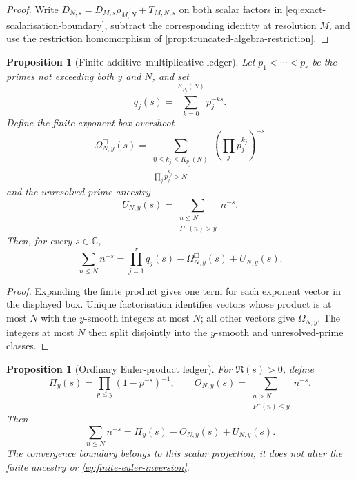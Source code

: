 \documentclass[11pt,a4paper]{article}
\newtheorem{proposition}[theorem]{Proposition}
\theoremstyle{definition}
\newcommand{\C}{\mathbb{C}}
\begin{document}
\begin{proof}
Write $D_{N,s}=D_{M,s}\rho_{M,N}+T_{M,N,s}$ on both scalar factors in
\cref{eq:exact-scalarisation-boundary}, subtract the corresponding identity at
resolution $M$, and use the restriction homomorphism of
\cref{prop:truncated-algebra-restriction}.
\end{proof}

\begin{proposition}[Finite additive--multiplicative ledger]
\label{prop:finite-additive-multiplicative-ledger}
Let $p_1<\cdots<p_r$ be the primes not exceeding both $y$ and $N$, and set
\[
  q_j(s)=\sum_{k=0}^{K_{p_j}(N)}p_j^{-ks}.
\]
Define the finite exponent-box overshoot
\[
  \Omega^\Box_{N,y}(s)
  =
  \sum_{\substack{0\leq k_j\leq K_{p_j}(N)\\
                  \prod_jp_j^{k_j}>N}}
  \left(\prod_jp_j^{k_j}\right)^{-s}
\]
and the unresolved-prime ancestry
\[
  U_{N,y}(s)
  =
  \sum_{\substack{n\leq N\\P^+(n)>y}}n^{-s}.
\]
Then, for every $s\in\C$,
\begin{equation}
\label{eq:finite-additive-multiplicative-ledger}
  \sum_{n\leq N}n^{-s}
  =
  \prod_{j=1}^{r}q_j(s)
  -\Omega^\Box_{N,y}(s)
  +U_{N,y}(s).
\end{equation}
\end{proposition}

\begin{proof}
Expanding the finite product gives one term for each exponent vector in the
displayed box. Unique factorisation identifies vectors whose product is at most
$N$ with the $y$-smooth integers at most $N$; all other vectors give
$\Omega^\Box_{N,y}$. The integers at most $N$ then split disjointly into the
$y$-smooth and unresolved-prime classes.
\end{proof}

\begin{proposition}[Ordinary Euler-product ledger]
\label{prop:ordinary-euler-product-ledger}
For $\Re(s)>0$, define
\[
  \Pi_y(s)=\prod_{p\leq y}(1-p^{-s})^{-1},
  \qquad
  O_{N,y}(s)=
  \sum_{\substack{n>N\\P^+(n)\leq y}}n^{-s}.
\]
Then
\begin{equation}
\label{eq:ordinary-euler-product-ledger}
  \sum_{n\leq N}n^{-s}
  =\Pi_y(s)-O_{N,y}(s)+U_{N,y}(s).
\end{equation}
The convergence boundary belongs to this scalar projection; it does not alter
the finite ancestry or \cref{eq:finite-euler-inversion}.
\end{proposition}
\end{document}
